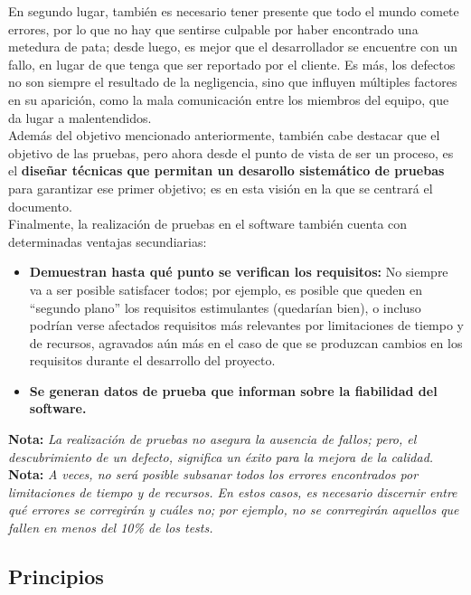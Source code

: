 En segundo lugar, también es necesario tener presente que todo el mundo comete errores, por lo que no hay que sentirse culpable por haber encontrado una metedura de pata; desde luego, es mejor que el desarrollador se encuentre con un fallo, en lugar de que tenga que ser reportado por el cliente. Es más, los defectos no son siempre el resultado de la negligencia, sino que influyen múltiples factores en su aparición, como la mala comunicación entre los miembros del equipo, que da lugar a malentendidos.\\

Además del objetivo mencionado anteriormente, también cabe destacar que el objetivo de las pruebas, pero ahora desde el punto de vista de ser un proceso, es el \textbf{diseñar técnicas que permitan un desarollo sistemático de pruebas} para garantizar ese primer objetivo; es en esta visión en la que se centrará el documento.\\

Finalmente, la realización de pruebas en el software también cuenta con determinadas ventajas secundiarias:

\begin{itemize}
    \item \textbf{Demuestran hasta qué punto se verifican los requisitos:} No siempre va a ser posible satisfacer todos; por ejemplo, es posible que queden en ``segundo plano'' los requisitos estimulantes (quedarían bien), o incluso podrían verse afectados requisitos más relevantes por limitaciones de tiempo y de recursos, agravados aún más en el caso de que se produzcan cambios en los requisitos durante el desarrollo del proyecto.
    \item \textbf{Se generan datos de prueba que informan sobre la fiabilidad del software.}
\end{itemize}

\textbf{Nota:} \textit{La realización de pruebas no asegura la ausencia de fallos; pero, el descubrimiento de un defecto, significa un éxito para la mejora de la calidad.}\\

\textbf{Nota:} \textit{A veces, no será posible subsanar todos los errores encontrados por limitaciones de tiempo y de recursos. En estos casos, es necesario discernir entre qué errores se corregirán y cuáles no; por ejemplo, no se conrregirán aquellos que fallen en menos del 10\% de los tests.}

\subsection{Principios}

